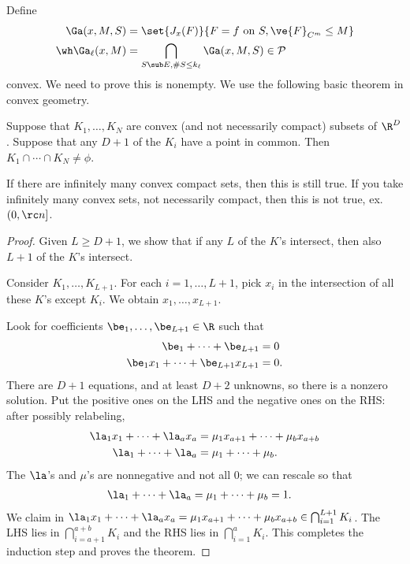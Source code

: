 Define 
\begin{align}
\Ga(x,M,S) &= \set{J_x(F)}{F=f\text{ on }S, \ve{F}_{C^m}\le M}\\
\wh \Ga_\ell(x,M) &= \bigcap_{S\sub E, \#S\le k_\ell} \Ga(x,M,S)\in \cal P
\end{align}
convex. We need to prove this is nonempty. We use the following basic theorem in convex geometry.
\begin{thm}
Suppose that $K_1,\ldots, K_N$ are convex (and not necessarily compact) subsets of $\R^D$. 
Suppose that any $D+1$ of the $K_i$ have a point in common. Then $K_1\cap \cdots \cap K_N\ne \phi$.
\end{thm}
If there are infinitely many convex compact sets, then this is still true.
If you take infinitely many convex sets, not necessarily compact, then this is not true, ex. $(0,\rc n]$. 
\begin{proof}
Given $L\ge D+1$, we show that if any $L$ of the $K$'s intersect, then also $L+1$ of the $K$'s intersect.

Consider $K_1,\ldots, K_{L+1}$. For each $i=1,\ldots, L+1$, pick $x_i$ in the intersection of all these $K$'s except $K_i$. 
We obtain $x_1,\ldots, x_{L+1}$. 

Look for coefficients $\be_1,\ldots, \be_{L+1}\in \R$ such that 
\begin{align}
\be_1+\cdots + \be_{L+1}&=0\\
\be_1x_1+\cdots + \be_{L+1}x_{L+1}&=0.
\end{align}
There are $D+1$ equations, and at least $D+2$ unknowns, so there is a nonzero solution. Put the positive ones on the LHS and the negative ones on the RHS: after possibly relabeling,
\begin{align}
\la_1x_1+\cdots +\la_ax_a &= \mu_1x_{a+1}+\cdots + \mu_b x_{a+b}\\
\la_1+\cdots + \la_a &= \mu_1+\cdots +\mu_b.
\end{align}
The $\la$'s and $\mu$'s are nonnegative and not all 0; we can rescale so that 
\begin{align}
\la_1+\cdots + \la_a &= \mu_1+\cdots +\mu_b=1.
\end{align}
We claim in $\la_1x_1+\cdots +\la_ax_a = \mu_1x_{a+1}+\cdots + \mu_b x_{a+b} \in \bigcap_{i=1}^{L+1}K_i$. The LHS lies in 
$\bigcap_{i=a+1}^{a+b} K_i$ and the RHS lies in $\bigcap_{i=1}^a K_i$. This completes the induction step and proves the theorem. 
\end{proof}






